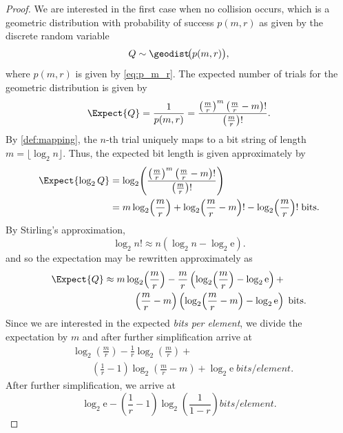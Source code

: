 \documentclass[hidelinks,11pt,final]{article}
\theoremstyle{plain}
\begin{document}
\begin{proof}
We are interested in the first case when no collision occurs, which is a geometric distribution with probability of success $p(m,r)$ as given by the discrete random variable
\begin{equation}
    Q \sim \geodist\!\bigl(p\!\left(m,r\right)\bigr),
\end{equation}
where $p(m,r)$ is given by \cref{eq:p_m_r}. The expected number of trials for the geometric distribution is given by
\begin{equation}
    \Expect{Q} = \frac{1}{p(m,r)} = \frac{\left(\frac{m}{r}\right)^m \left(\frac{m}{r}-m\right)!}{\left(\frac{m}{r}\right)!}.
\end{equation}
By \cref{def:mapping}, the $n$-th trial uniquely maps to a bit string of length $m = \lfloor \log_2 n \rfloor$. Thus, the expected bit length is given approximately by
\begin{align}
    \Expect{\log_2 Q}
        &= \log_2\!\left(\frac{\left(\frac{m}{r}\right)^m \left(\frac{m}{r}-m\right)!}{\left(\frac{m}{r}\right)!}\right)\\
        &= m \log_2\!\left(\frac{m}{r}\right) +
            \log_2\!\left(\frac{m}{r}-m\right)! - \log_2\!\left(\frac{m}{r}\right)! \; \si{bits}.
\end{align}
By Stirling's approximation, 
\begin{equation}
    \log_2 n! \approx n \left(\log_2 n - \log_2 \mathrm{e}\right).
\end{equation}
and so the expectation may be rewritten approximately as
\begin{equation}
\begin{split}
    \Expect{Q} \approx &\;
        m \log_2\!\left(\frac{m}{r}\right) -
            \frac{m}{r} \left(\log_2\!\left(\frac{m}{r}\right) - \log_2 \mathrm{e}\right) +\\
        &\qquad\left(\frac{m}{r}-m\right) \left(\log_2\!\left(\frac{m}{r}-m\right) - \log_2 \mathrm{e} \right) \; \si{bits}.
\end{split}
\end{equation}
Since we are interested in the expected \emph{bits per element}, we divide the expectation by $m$ and after further simplification arrive at
\begin{equation}
\begin{split}
    &\log_2\!\left(\frac{m}{r}\right) - \frac{1}{r} \log_2\!\left(\frac{m}{r}\right) +\\
    &\qquad \left(\frac{1}{r}-1\right) \log_2\!\left(\frac{m}{r}-m\right) + \log_2 \mathrm{e} \; \si{bits \per element}.
\end{split}
\end{equation}
After further simplification, we arrive at
\begin{equation}
    \log_2 \mathrm{e} - \left(\frac{1}{r} - 1\right) \log_2\!\left(\frac{1}{1-r}\right) \si{bits \per element}.
\end{equation}
\end{proof}
\end{document}
